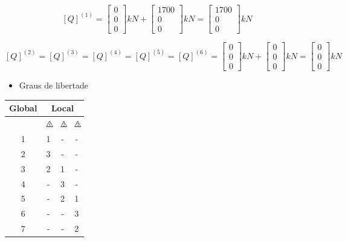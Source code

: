 \documentclass{article} %
\newcommand{\trinum}[1]{%
	\triangle\hspace{-.57em}\raisebox{0.1em}{\scalebox{.5}{#1}}
}
\begin{document}
\begin{equation}\label{}
[Q]^{(1)}=
\begin{bmatrix}
0\\
0\\
0
\end{bmatrix}kN+\begin{bmatrix}
1700\\
0\\
0
\end{bmatrix}kN=\begin{bmatrix}
1700\\
0\\
0
\end{bmatrix}kN
\end{equation}


\begin{equation}\label{}
[Q]^{(2)}=[Q]^{(3)}=[Q]^{(4)}=[Q]^{(5)}=[Q]^{(6)}=
\begin{bmatrix}
0\\
0\\
0
\end{bmatrix}kN+\begin{bmatrix}
0\\
0\\
0
\end{bmatrix}kN=
\begin{bmatrix}
0\\
0\\
0
\end{bmatrix}kN
\end{equation}



\begin{itemize}
	\item Graus de libertade
\end{itemize}


\begin{table}[H]
	\centering
\begin{tabular}{@{}cccc@{}}
	\toprule
	Global & \multicolumn{3}{c}{Local} \\ \midrule
	& $\trinum{1}$ & $\trinum{2}$ & $\trinum{3}$ \\ \midrule
	1 & 1 & - & - \\
	2 & 3 & - & - \\
	3 & 2& 1& -\\
	4 & - & 3 & - \\
	5 & - & 2 & 1 \\
	6 & - & - & 3\\
	7 & - & - & 2 \\ \bottomrule
\end{tabular}
\end{table}
\end{document}
